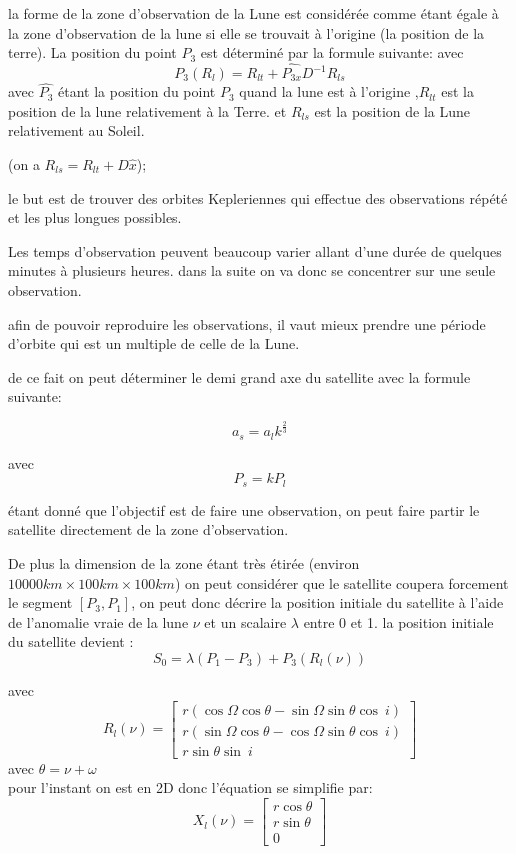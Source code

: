 \documentclass{article} %
\begin{document}
		la forme de la zone d'observation de la Lune est considérée comme étant égale à la zone d'observation de la lune si elle se trouvait à l'origine (la position de la terre). La position du point $P_3$ est déterminé par la formule suivante:
		avec 
		$$
		P_3(R_l)=R_{lt}+\hat{P_{3x}}D^{-1}R_{ls}
		$$
		avec $\hat{P_3}$ étant la position du point $P_3$ quand la lune est à l'origine
		,$R_{lt}$ est la position de la lune relativement à la Terre.
		et $R_{ls}$ est la position de la Lune relativement au Soleil.
		
		(on a $R_{ls} = R_{lt}+D\hat{x}$);
		
		le but est de trouver des orbites Kepleriennes qui effectue des observations répété et les plus longues possibles.
		
		Les temps d'observation peuvent beaucoup varier allant d'une durée de quelques minutes à plusieurs heures.	dans la suite on va donc se concentrer sur une seule observation.
		
		afin de pouvoir reproduire les observations, il vaut mieux prendre une période d'orbite qui est un multiple de celle de la Lune.
		
		de ce fait on peut déterminer le demi grand axe du satellite avec la formule suivante:
		
		$$
		a_s=a_lk^{\frac{2}{3}}
		$$
		
		avec
		$$
		P_s=kP_l
		$$
		
		étant donné que l'objectif est de faire une observation, on peut faire partir le satellite directement de la zone d'observation.
		
		De plus la dimension de la zone étant très étirée (environ $10000km\times100km\times100km$) on peut considérer que le satellite coupera forcement le segment $[P_3,P_1]$, on peut donc décrire la position initiale du satellite à l'aide de l'anomalie vraie de la lune $\nu$ et un scalaire $\lambda$ entre 0 et 1. la position initiale du satellite devient : 
		$$
		S_0=\lambda(P_1-P_3)+P_3(R_l(\nu))
		$$
		
		avec 
		$$
		R_l(\nu)=\begin{bmatrix}
			r( \cos\Omega \cos\theta -\sin\Omega \sin\theta \cos\ i)\\
			r( \sin\Omega \cos\theta -\cos\Omega \sin\theta \cos\ i)\\
			r\sin\theta \sin\ i\ 
		\end{bmatrix}
		$$
		avec $\theta = \nu+\omega$ \\
		pour l'instant on est en 2D donc l'équation se simplifie par:
		$$
		X_l(\nu)=\begin{bmatrix}
			r \cos\theta \\
			r \sin\theta \\
			0 
		\end{bmatrix}
		$$
		
\end{document}
